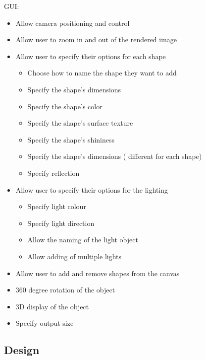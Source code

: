 \documentclass[11pt,a4paper]{article}
\begin{document}
GUI:
\begin{itemize}[nosep, wide=20pt, leftmargin=*, after=\strut]
    \item Allow camera positioning and control 
    \item Allow user to zoom in and out of the rendered image
    \item Allow user to specify their options for each shape 
    
    \begin{itemize}[nosep, wide=20pt, leftmargin=*, after=\strut]
        \item Choose how to name the shape they want to add
        \item Specify the shape’s dimensions
        \item Specify the shape’s color
        \item Specify the shape’s surface texture 
        \item Specify the shape’s shininess 
        \item Specify the shape’s dimensions ( different for each shape)
        \item Specify reflection 
    \end{itemize}
    
    \item Allow user to specify their options for the lighting 
    
    \begin{itemize}[nosep, wide=20pt, leftmargin=*, after=\strut]
        \item Specify light colour
        \item Specify light direction
        \item Allow the naming of the light object 
        \item Allow adding of multiple lights
    \end{itemize}
    
    \item Allow user to add and remove shapes from the canvas 
    \item 360 degree rotation of the object 
    \item 3D display of the object 
    \item Specify output size 

\end{itemize}

\subsection{Design}
\end{document}
